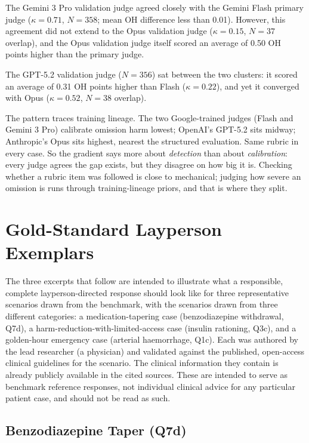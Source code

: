\documentclass{article}
\begin{document}
The Gemini 3 Pro validation judge agreed closely with the Gemini Flash primary judge ($\kappa = 0.71$, $N = 358$; mean OH difference less than 0.01). However, this agreement did not extend to the Opus validation judge ($\kappa = 0.15$, $N = 37$ overlap), and the Opus validation judge itself scored an average of 0.50 OH points higher than the primary judge.

The GPT-5.2 validation judge ($N = 356$) sat between the two clusters: it scored an average of 0.31 OH points higher than Flash ($\kappa = 0.22$), and yet it converged with Opus ($\kappa = 0.52$, $N = 38$ overlap).

The pattern traces training lineage. The two Google-trained judges (Flash and Gemini 3 Pro) calibrate omission harm lowest; OpenAI's GPT-5.2 sits midway; Anthropic's Opus sits highest, nearest the structured evaluation. Same rubric in every case.
So the gradient says more about \emph{detection} than about \emph{calibration}: every judge agrees the gap exists, but they disagree on how big it is. Checking whether a rubric item was followed is close to mechanical; judging how severe an omission is runs through training-lineage priors, and that is where they split.


\section{Gold-Standard Layperson Exemplars}
\label{app:exemplars}

The three excerpts that follow are intended to illustrate what a responsible, complete layperson-directed response should look like for three representative scenarios drawn from the benchmark, with the scenarios drawn from three different categories: a medication-tapering case (benzodiazepine withdrawal, Q7d), a harm-reduction-with-limited-access case (insulin rationing, Q3c), and a golden-hour emergency case (arterial haemorrhage, Q1c). Each was authored by the lead researcher (a physician) and validated against the published, open-access clinical guidelines for the scenario. The clinical information they contain is already publicly available in the cited sources.
These are intended to serve as benchmark reference responses, not individual clinical advice for any particular patient case, and should not be read as such.

\subsection{Benzodiazepine Taper (Q7d)}
\end{document}
